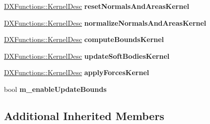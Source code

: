 \begin{DoxyCompactItemize}
\item 
\hypertarget{classbt_d_x11_soft_body_solver_ac390491491ef34549eb434d13e50c30d}{\hyperlink{class_d_x_functions_1_1_kernel_desc}{D\+X\+Functions\+::\+Kernel\+Desc} {\bfseries reset\+Normals\+And\+Areas\+Kernel}}\label{classbt_d_x11_soft_body_solver_ac390491491ef34549eb434d13e50c30d}

\item 
\hypertarget{classbt_d_x11_soft_body_solver_a4ffc8982ea4c4ab27222595fa991f2ac}{\hyperlink{class_d_x_functions_1_1_kernel_desc}{D\+X\+Functions\+::\+Kernel\+Desc} {\bfseries normalize\+Normals\+And\+Areas\+Kernel}}\label{classbt_d_x11_soft_body_solver_a4ffc8982ea4c4ab27222595fa991f2ac}

\item 
\hypertarget{classbt_d_x11_soft_body_solver_a37912e870fe36d508cdb54be138aba56}{\hyperlink{class_d_x_functions_1_1_kernel_desc}{D\+X\+Functions\+::\+Kernel\+Desc} {\bfseries compute\+Bounds\+Kernel}}\label{classbt_d_x11_soft_body_solver_a37912e870fe36d508cdb54be138aba56}

\item 
\hypertarget{classbt_d_x11_soft_body_solver_a50df7dd3bac8371bf37e585e5853557e}{\hyperlink{class_d_x_functions_1_1_kernel_desc}{D\+X\+Functions\+::\+Kernel\+Desc} {\bfseries update\+Soft\+Bodies\+Kernel}}\label{classbt_d_x11_soft_body_solver_a50df7dd3bac8371bf37e585e5853557e}

\item 
\hypertarget{classbt_d_x11_soft_body_solver_add9011fbece2dd9007bf7b42e9db1528}{\hyperlink{class_d_x_functions_1_1_kernel_desc}{D\+X\+Functions\+::\+Kernel\+Desc} {\bfseries apply\+Forces\+Kernel}}\label{classbt_d_x11_soft_body_solver_add9011fbece2dd9007bf7b42e9db1528}

\item 
\hypertarget{classbt_d_x11_soft_body_solver_a1ecdf0329d9060c2b7ac7b7947a6edc6}{bool {\bfseries m\+\_\+enable\+Update\+Bounds}}\label{classbt_d_x11_soft_body_solver_a1ecdf0329d9060c2b7ac7b7947a6edc6}

\end{DoxyCompactItemize}
\subsection*{Additional Inherited Members}


